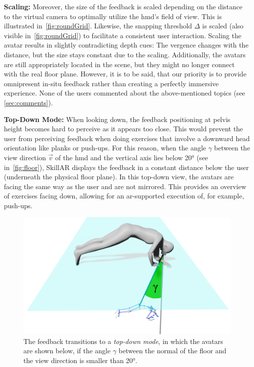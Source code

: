 \textbf{Scaling:}
Moreover, the size of the feedback is scaled depending on the distance to the virtual camera to optimally utilize the \acrshort{hmd}'s field of view.  This is illustrated in~\autoref{fig:roundGrid}. Likewise, the snapping threshold $\Delta$ is scaled (also visible in~\autoref{fig:roundGrid}) to facilitate a consistent user interaction. Scaling the avatar results in slightly contradicting depth cues: The vergence changes with the distance, but the size stays constant due to the scaling. Additionally, the avatars are still appropriately located in the scene, but they might no longer connect with the real floor plane. However, it is to be said, that our priority is to provide omnipresent in-situ feedback rather than creating a perfectly immersive experience. None of the users commented about the above-mentioned topics (see \autoref{sec:comments}).

\textbf{Top-Down Mode:}
When looking down, the feedback positioning at pelvis height becomes hard to perceive as it appears too close. This would prevent the user from perceiving feedback when doing exercises that involve a downward head orientation like planks or push-ups. For this reason, when the angle $\gamma$ between the view direction $\vec{v}$ of the \acrshort{hmd} and the vertical axis lies below 20° (see in~\autoref{fig:floor}), SkillAR displays the feedback in a constant distance below the user (underneath the physical floor plane). In this top-down view, the avatars are facing the same way as the user and are not mirrored. This provides an overview of exercises facing down, allowing for an \acrshort{ar}-supported execution of, for example, push-ups.

\begin{figure}[h!]
	\centering
	\includegraphics[width=0.6\linewidth]{pictures/floorPos.png}
	\caption[Top-down mode visualizing exercises when looking down.]{The feedback transitions to a \emph{top-down mode}, in which the avatars are shown below, if the angle $\gamma$ between the normal of the floor and the view direction is smaller than 20°. \label{fig:floor}}
\end{figure}

